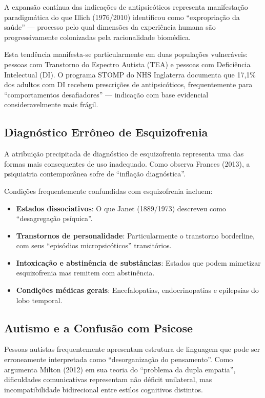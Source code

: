 A expansão contínua das indicações de antipsicóticos representa manifestação paradigmática do que Illich (1976/2010) identificou como \enquote{expropriação da saúde} --- processo pelo qual dimensões da experiência humana são progressivamente colonizadas pela racionalidade biomédica.

Esta tendência manifesta-se particularmente em duas populações vulneráveis: pessoas com Transtorno do Espectro Autista (TEA) e pessoas com Deficiência Intelectual (DI). O programa STOMP do NHS Inglaterra documenta que 17,1\% dos adultos com DI recebem prescrições de antipsicóticos, frequentemente para \enquote{comportamentos desafiadores} --- indicação com base evidencial consideravelmente mais frágil.

\subsection{Diagnóstico Errôneo de Esquizofrenia}

A atribuição precipitada de diagnóstico de esquizofrenia representa uma das formas mais consequentes de uso inadequado. Como observa Frances (2013), a psiquiatria contemporânea sofre de \enquote{inflação diagnóstica}.

Condições frequentemente confundidas com esquizofrenia incluem:

\begin{itemize}
\item \textbf{Estados dissociativos}: O que Janet (1889/1973) descreveu como \enquote{desagregação psíquica}.

\item \textbf{Transtornos de personalidade}: Particularmente o transtorno borderline, com seus \enquote{episódios micropsicóticos} transitórios.

\item \textbf{Intoxicação e abstinência de substâncias}: Estados que podem mimetizar esquizofrenia mas remitem com abstinência.

\item \textbf{Condições médicas gerais}: Encefalopatias, endocrinopatias e epilepsias do lobo temporal.
\end{itemize}

\subsection{Autismo e a Confusão com Psicose}

Pessoas autistas frequentemente apresentam estrutura de linguagem que pode ser erroneamente interpretada como \enquote{desorganização do pensamento}. Como argumenta Milton (2012) em sua teoria do \enquote{problema da dupla empatia}, dificuldades comunicativas representam não déficit unilateral, mas incompatibilidade bidirecional entre estilos cognitivos distintos.

